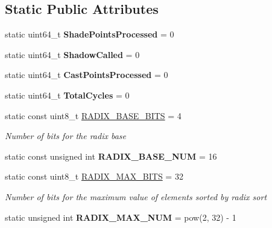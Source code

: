 \subsection*{Static Public Attributes}
\begin{DoxyCompactItemize}
\item 
static uint64\+\_\+t {\bfseries Shade\+Points\+Processed} = 0\hypertarget{classlighting_1_1CircleLightSource_ac5ee6f2194afd0dfd04470ca554d7c3a}{}\label{classlighting_1_1CircleLightSource_ac5ee6f2194afd0dfd04470ca554d7c3a}

\item 
static uint64\+\_\+t {\bfseries Shadow\+Called} = 0\hypertarget{classlighting_1_1CircleLightSource_a9ad414cfb620c9253fbda3d6a9b89f50}{}\label{classlighting_1_1CircleLightSource_a9ad414cfb620c9253fbda3d6a9b89f50}

\item 
static uint64\+\_\+t {\bfseries Cast\+Points\+Processed} = 0\hypertarget{classlighting_1_1CircleLightSource_aee2dd14e70c371618e6d7161b2e8187e}{}\label{classlighting_1_1CircleLightSource_aee2dd14e70c371618e6d7161b2e8187e}

\item 
static uint64\+\_\+t {\bfseries Total\+Cycles} = 0\hypertarget{classlighting_1_1CircleLightSource_ada2d8673056053ec59ce2053eb691e0a}{}\label{classlighting_1_1CircleLightSource_ada2d8673056053ec59ce2053eb691e0a}

\item 
static const uint8\+\_\+t \hyperlink{classlighting_1_1CircleLightSource_a94be83c3a3e575b5670ec6c6abe8a6e7}{R\+A\+D\+I\+X\+\_\+\+B\+A\+S\+E\+\_\+\+B\+I\+TS} = 4
\begin{DoxyCompactList}\small\item\em Number of bits for the radix base \end{DoxyCompactList}\item 
static const unsigned int {\bfseries R\+A\+D\+I\+X\+\_\+\+B\+A\+S\+E\+\_\+\+N\+UM} = 16\hypertarget{classlighting_1_1CircleLightSource_afa4c65f061bb4201a36aa7feee13b4c0}{}\label{classlighting_1_1CircleLightSource_afa4c65f061bb4201a36aa7feee13b4c0}

\item 
static const uint8\+\_\+t \hyperlink{classlighting_1_1CircleLightSource_a9a4d058eac85eeb8c542abd69069e4b2}{R\+A\+D\+I\+X\+\_\+\+M\+A\+X\+\_\+\+B\+I\+TS} = 32
\begin{DoxyCompactList}\small\item\em Number of bits for the maximum value of elements sorted by radix sort \end{DoxyCompactList}\item 
static unsigned int {\bfseries R\+A\+D\+I\+X\+\_\+\+M\+A\+X\+\_\+\+N\+UM} = pow(2, 32) -\/ 1\hypertarget{classlighting_1_1CircleLightSource_adaa12ee54e0cecf9691061646b7e71f4}{}\label{classlighting_1_1CircleLightSource_adaa12ee54e0cecf9691061646b7e71f4}


\end{DoxyCompactItemize}
